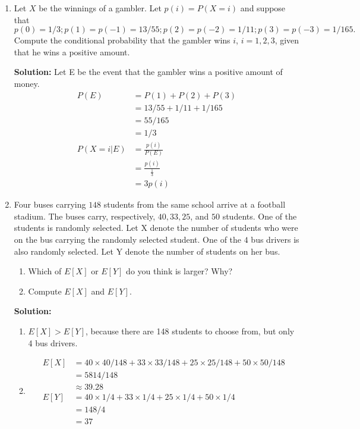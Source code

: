 \documentclass{report}
\begin{document}
\begin{enumerate}


\item Let $X$ be the winnings of a gambler. Let $p(i)=P(X=i)$ and suppose that
\[
  p(0)=1/3; p(1)=p(-1)=13/55; p(2)=p(-2)=1/11; p(3)=p(-3)=1/165.
\]
Compute the conditional probability that the gambler wins $i$, $i=1,2,3$, given that he wins a positive amount. 

{\bf Solution:} Let E be the event that the gambler wins a positive amount of money.
\begin{align*}
    P(E) &= P(1)+P(2)+P(3) \\
    &=13/55+1/11+1/165 \\
    &=55/165 \\
    &=1/3 \\
    P(X=i\vert E) &= \frac{p(i)}{P(E)} \\
    &=\frac{p(i)}{\frac{1}{3}} \\
    &=3p(i)
\end{align*}


\item Four buses carrying $148$ students from the same
school arrive at a football stadium. The buses carry, respectively,
$40, 33, 25$, and $50$ students. One of the students is
randomly selected. Let X denote the number of students
who were on the bus carrying the randomly selected student.
One of the $4$ bus drivers is also randomly selected.
Let Y denote the number of students on her bus.

\begin{enumerate}
	\item Which of $E[X]$ or $E[Y]$ do you think is larger? Why?
	\item Compute $E[X]$ and $E[Y]$. 
\end{enumerate}

{\bf Solution:}
\begin{enumerate}
    \item $E[X] > E[Y]$, because there are 148 students to choose from, but only 4 bus drivers.
    \item 
        \begin{align*}
            E[X]&=40\times 40/148 + 33 \times 33/148 + 25\times 25/148 + 50 \times 50/148 \\
            &= 5814/148 \\
            &\approx 39.28 \\
            E[Y]&=40\times1/4+33\times1/4+25\times1/4+50\times 1/4 \\
            &=148/4 \\
            &=37
        \end{align*}
\end{enumerate}


\end{enumerate}
\end{document}

